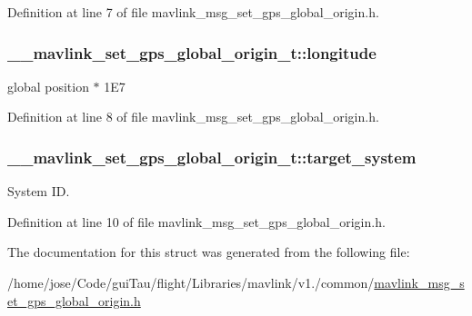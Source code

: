 Definition at line 7 of file mavlink\-\_\-msg\-\_\-set\-\_\-gps\-\_\-global\-\_\-origin.\-h.

\hypertarget{struct____mavlink__set__gps__global__origin__t_a1558c474ba2b7f246bb22f170677f4d3}{
\subsubsection[{longitude}]{ \-\_\-\-\_\-mavlink\-\_\-set\-\_\-gps\-\_\-global\-\_\-origin\-\_\-t\-::longitude}}\label{struct____mavlink__set__gps__global__origin__t_a1558c474ba2b7f246bb22f170677f4d3}


global position $\ast$ 1\-E7 



Definition at line 8 of file mavlink\-\_\-msg\-\_\-set\-\_\-gps\-\_\-global\-\_\-origin.\-h.

\hypertarget{struct____mavlink__set__gps__global__origin__t_a8b0950dbed98f3f0515bb5726bc5184c}{
\subsubsection[{target\-\_\-system}]{ \-\_\-\-\_\-mavlink\-\_\-set\-\_\-gps\-\_\-global\-\_\-origin\-\_\-t\-::target\-\_\-system}}\label{struct____mavlink__set__gps__global__origin__t_a8b0950dbed98f3f0515bb5726bc5184c}


System I\-D. 



Definition at line 10 of file mavlink\-\_\-msg\-\_\-set\-\_\-gps\-\_\-global\-\_\-origin.\-h.



The documentation for this struct was generated from the following file\-:\begin{DoxyCompactItemize}
\item 
/home/jose/\-Code/gui\-Tau/flight/\-Libraries/mavlink/v1./common/\hyperlink{mavlink__msg__set__gps__global__origin_8h}{mavlink\-\_\-msg\-\_\-set\-\_\-gps\-\_\-global\-\_\-origin.\-h}\end{DoxyCompactItemize}
